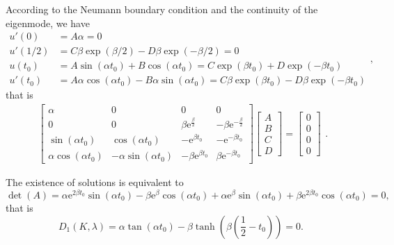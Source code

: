 \documentclass[a4paper,11pt]{article}
\begin{document}
\begin{appendices}
According to the Neumann boundary condition and the continuity of the eigenmode, we have
\begin{equation*}
\begin{split}
u'(0) & = A \alpha = 0 \\
u'(1/2) & = C \beta \exp(\beta/2) - D \beta \exp(-\beta/2) = 0 \\
u(t_0) & = A \sin(\alpha t_0) + B \cos(\alpha t_0) = C \exp(\beta t_0) + D \exp(-\beta t_0) \\
u'(t_0) & = A \alpha \cos(\alpha t_0) - B \alpha \sin(\alpha t_0) = C \beta \exp(\beta t_0) - D \beta \exp(-\beta t_0)
\end{split},
\end{equation*}
that is
\begin{equation*}
\begin{split}
\left[\begin{array}{cccc} \alpha & 0 & 0 & 0\\ 0 & 0 & \beta \mathrm{e}^{\frac{\beta}{2}} & - \beta \mathrm{e}^{-\frac{\beta}{2}}\\ \sin\!\left(\alpha t_0\right) & \cos\!\left(\alpha t_0\right) & - \mathrm{e}^{\beta t_0} & - \mathrm{e}^{- \beta t_0}\\ \alpha \cos\!\left(\alpha t_0\right) & - \alpha \sin\!\left(\alpha t_0\right) & - \beta \mathrm{e}^{\beta t_0} & \beta \mathrm{e}^{- \beta t_0} \end{array}\right]
\left[\begin{array}{c} A \\ B \\ C \\ D \end{array}\right]
=
\left[\begin{array}{c} 0 \\ 0 \\ 0 \\ 0 \end{array}\right]
\end{split}.
\end{equation*}

The existence of solutions is equivalent to
\begin{equation*}
\det(A) = \alpha \mathrm{e}^{2 \beta t_0} \sin\!\left(\alpha t_0\right) - \beta \mathrm{e}^{\beta} \cos\!\left(\alpha t_0\right) + \alpha \mathrm{e}^{\beta} \sin\!\left(\alpha t_0\right) + \beta \mathrm{e}^{2 \beta t_0} \cos\!\left(\alpha t_0\right) = 0,
\end{equation*}
that is
\begin{equation*}
D_1(K, \lambda) = \alpha \tan(\alpha t_0) - \beta \tanh(\beta (\frac12 - t_0)) = 0.
\end{equation*}


\end{appendices}
\end{document}
